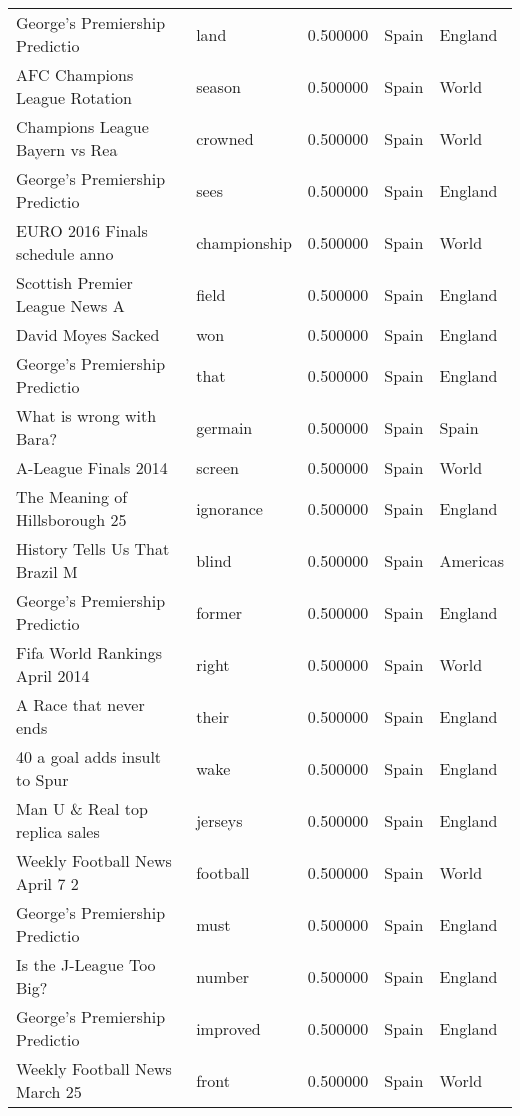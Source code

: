 \begin{table}[h]
\begin{tabular}{l|l|l|l|l}
George's Premiership Predictio  & land          & 0.500000 & Spain   & England  \\
AFC Champions League Rotation   & season       & 0.500000 & Spain   & World    \\
Champions League Bayern vs Rea  & crowned      & 0.500000 & Spain   & World    \\
George's Premiership Predictio  & sees         & 0.500000 & Spain   & England  \\
EURO 2016 Finals schedule anno  & championship & 0.500000 & Spain   & World    \\
Scottish Premier League News A  & field         & 0.500000 & Spain   & England  \\
David Moyes Sacked              & won          & 0.500000 & Spain   & England  \\
George's Premiership Predictio  & that         & 0.500000 & Spain   & England  \\
What is wrong with Bara?        & germain      & 0.500000 & Spain   & Spain    \\
A-League Finals 2014            & screen       & 0.500000 & Spain   & World    \\
The Meaning of Hillsborough 25  & ignorance    & 0.500000 & Spain   & England  \\
History Tells Us That Brazil M  & blind        & 0.500000 & Spain   & Americas \\
George's Premiership Predictio  & former       & 0.500000 & Spain   & England  \\
Fifa World Rankings April 2014  & right        & 0.500000 & Spain   & World    \\
A Race that never ends          & their        & 0.500000 & Spain   & England  \\
40 a goal adds insult to Spur   & wake         & 0.500000 & Spain   & England  \\
Man U \& Real top replica sales & jerseys      & 0.500000 & Spain   & England  \\
Weekly Football News April 7 2  & football     & 0.500000 & Spain   & World    \\
George's Premiership Predictio  & must         & 0.500000 & Spain   & England  \\
Is the J-League Too Big?        & number       & 0.500000 & Spain   & England  \\
George's Premiership Predictio  & improved     & 0.500000 & Spain   & England  \\
Weekly Football News March 25   & front        & 0.500000 & Spain   & World    \\

\end{tabular}
\end{table}
